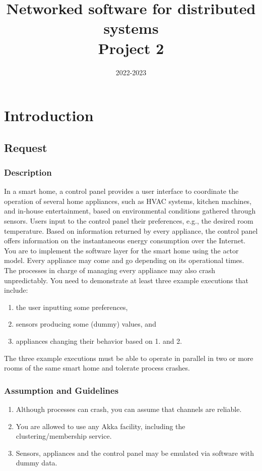 \documentclass[11pt]{article}
\title{Networked software for distributed systems\\Project 2}
\date{2022-2023}
\begin{document}


\tableofcontents
\cleardoublepage

\section{Introduction}
\subsection{Request}
\subsubsection{Description}
In a smart home, a control panel provides a user interface to coordinate the operation of several home appliances, such as HVAC systems, kitchen machines, and in-house entertainment, based on environmental conditions gathered through sensors. Users input to the control panel their preferences, e.g., the desired room temperature. Based on information returned by every appliance, the control panel offers information on the instantaneous energy consumption over the Internet. You are to implement the software layer for the smart home using the actor model. Every appliance may come and go depending on its operational times. The processes in charge of managing every appliance may also crash unpredictably. You need to demonstrate at least three example executions that include: 
\begin{enumerate}
\item the user inputting some preferences,  

\item sensors producing some (dummy) values, and  

\item appliances changing their behavior based on 1. and 2.  
\end{enumerate}
The three example executions must be able to operate in parallel in two or more rooms of the same smart home and tolerate process crashes.  
\subsubsection{Assumption and Guidelines}
\begin{enumerate}
    \item Although processes can crash, you can assume that channels are reliable. 

\item You are allowed to use any Akka facility, including the clustering/membership service. 

\item Sensors, appliances and the control panel may be emulated via software with dummy data. 
\end{enumerate}
\end{document}
